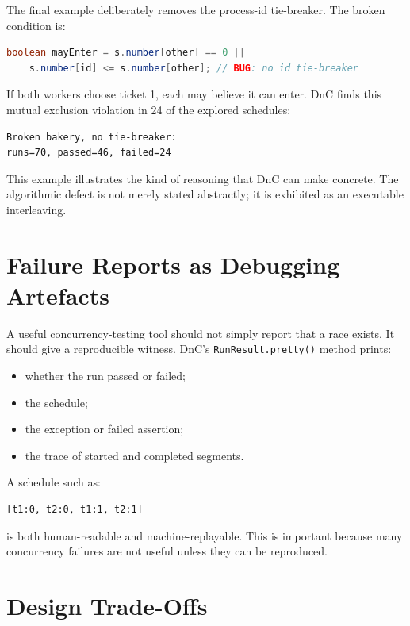 \documentclass[11pt]{article}
\begin{document}
The final example deliberately removes the process-id tie-breaker. The broken condition is:

\begin{lstlisting}[language=Java]
boolean mayEnter = s.number[other] == 0 ||
    s.number[id] <= s.number[other]; // BUG: no id tie-breaker
\end{lstlisting}

If both workers choose ticket 1, each may believe it can enter. DnC finds this mutual exclusion violation in 24 of the explored schedules:

\begin{lstlisting}
Broken bakery, no tie-breaker:
runs=70, passed=46, failed=24
\end{lstlisting}

This example illustrates the kind of reasoning that DnC can make concrete. The algorithmic defect is not merely stated abstractly; it is exhibited as an executable interleaving.

\section{Failure Reports as Debugging Artefacts}

A useful concurrency-testing tool should not simply report that a race exists. It should give a reproducible witness. DnC's \texttt{RunResult.pretty()} method prints:

\begin{itemize}[nosep]
  \item whether the run passed or failed;
  \item the schedule;
  \item the exception or failed assertion;
  \item the trace of started and completed segments.
\end{itemize}

A schedule such as:

\begin{lstlisting}
[t1:0, t2:0, t1:1, t2:1]
\end{lstlisting}

is both human-readable and machine-replayable. This is important because many concurrency failures are not useful unless they can be reproduced.

\section{Design Trade-Offs}
\end{document}
